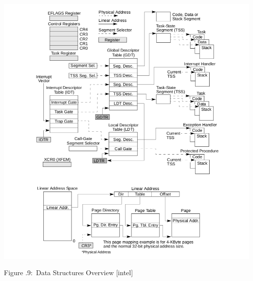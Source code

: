 \documentclass[twoside]{article}
\newcounter{lecnum}
\renewcommand{\cite}[1]{[#1]}
\newcommand{\fig}[3]{
            \vspace{#2}
            \begin{center}
            Figure \thelecnum.#1:~#3
            \end{center}
    }
\begin{document}
\begin{center}
  \includegraphics[width=\textwidth]{sysds.png}
  \fig{9}{0 pt}{Data Structures Overview \cite{intel}}
\end{center}


\newpage


\end{document}
